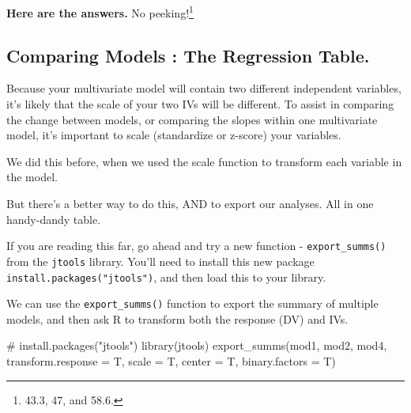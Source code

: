 \documentclass[
  letterpaper,
  DIV=11,
  numbers=noendperiod,
  oneside]{scrreprt}
\newenvironment{Shaded}{\begin{snugshade}}{\end{snugshade}}
\newcommand{\AttributeTok}[1]{\textcolor[rgb]{0.40,0.45,0.13}{#1}}
\newcommand{\CommentTok}[1]{\textcolor[rgb]{0.37,0.37,0.37}{#1}}
\newcommand{\FunctionTok}[1]{\textcolor[rgb]{0.28,0.35,0.67}{#1}}
\newcommand{\NormalTok}[1]{\textcolor[rgb]{0.00,0.23,0.31}{#1}}
\begin{document}
\textbf{Here are the answers.} No peeking!\footnote{43.3, 47, and 58.6.}

\subsection{Comparing Models : The Regression
Table.}\label{comparing-models-the-regression-table.}

Because your multivariate model will contain two different independent
variables, it's likely that the scale of your two IVs will be different.
To assist in comparing the change between models, or comparing the
slopes within one multivariate model, it's important to scale
(standardize or z-score) your variables.

We did this before, when we used the scale function to transform each
variable in the model.

But there's a better way to do this, AND to export our analyses. All in
one handy-dandy table.

If you are reading this far, go ahead and try a new function -
\texttt{export\_summs()} from the \texttt{jtools} library. You'll need
to install this new package \texttt{install.packages("jtools")}, and
then load this to your library.

We can use the \texttt{export\_summs()} function to export the summary
of multiple models, and then ask R to transform both the response (DV)
and IVs.

\begin{Shaded}
\begin{Highlighting}[]
\CommentTok{\# install.packages("jtools")}
\FunctionTok{library}\NormalTok{(jtools)}
\FunctionTok{export\_summs}\NormalTok{(mod1, mod2, mod4, }\AttributeTok{transform.response =}\NormalTok{ T, }\AttributeTok{scale =}\NormalTok{ T, }\AttributeTok{center =}\NormalTok{ T, }\AttributeTok{binary.factors =}\NormalTok{ T)}
\end{Highlighting}
\end{Shaded}

 
  \providecommand{\huxb}[2]{\arrayrulecolor[RGB]{#1}\global\arrayrulewidth=#2pt}
  \providecommand{\huxvb}[2]{\color[RGB]{#1}\vrule width #2pt}
  \providecommand{\huxtpad}[1]{\rule{0pt}{#1}}
  \providecommand{\huxbpad}[1]{\rule[-#1]{0pt}{#1}}
\end{document}
